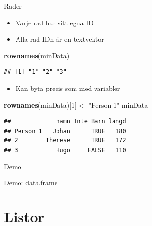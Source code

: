 \documentclass[
  11pt,
  ignorenonframetext,
]{beamer}
\newenvironment{Shaded}{\begin{snugshade}}{\end{snugshade}}
\newcommand{\DecValTok}[1]{\textcolor[rgb]{0.00,0.00,0.81}{#1}}
\newcommand{\FunctionTok}[1]{\textcolor[rgb]{0.13,0.29,0.53}{\textbf{#1}}}
\newcommand{\NormalTok}[1]{#1}
\newcommand{\OtherTok}[1]{\textcolor[rgb]{0.56,0.35,0.01}{#1}}
\newcommand{\StringTok}[1]{\textcolor[rgb]{0.31,0.60,0.02}{#1}}
\providecommand{\tightlist}{%
  \setlength{\itemsep}{0pt}\setlength{\parskip}{0pt}}
\begin{document}
\begin{frame}[fragile]{Rader}
\label{rader}
\begin{itemize}
\tightlist
\item
  Varje rad har sitt egna ID
\item
  Alla rad IDn är en textvektor
\end{itemize}

\begin{Shaded}
\begin{Highlighting}[]
\FunctionTok{rownames}\NormalTok{(minData)}
\end{Highlighting}
\end{Shaded}

\begin{verbatim}
## [1] "1" "2" "3"
\end{verbatim}

\pause

\begin{itemize}
\tightlist
\item
  Kan byta precis som med variabler
\end{itemize}

\begin{Shaded}
\begin{Highlighting}[]
\FunctionTok{rownames}\NormalTok{(minData)[}\DecValTok{1}\NormalTok{] }\OtherTok{\textless{}{-}} \StringTok{"Person 1"}
\NormalTok{minData}
\end{Highlighting}
\end{Shaded}

\begin{verbatim}
##             namn Inte Barn langd
## Person 1   Johan      TRUE   180
## 2        Therese      TRUE   172
## 3           Hugo     FALSE   110
\end{verbatim}
\end{frame}

\begin{frame}{Demo}
\label{demo-1}
\begin{block}{Demo: data.frame}
\label{demo-data.frame}
\end{block}
\end{frame}

\section{Listor}\label{listor}
\end{document}
